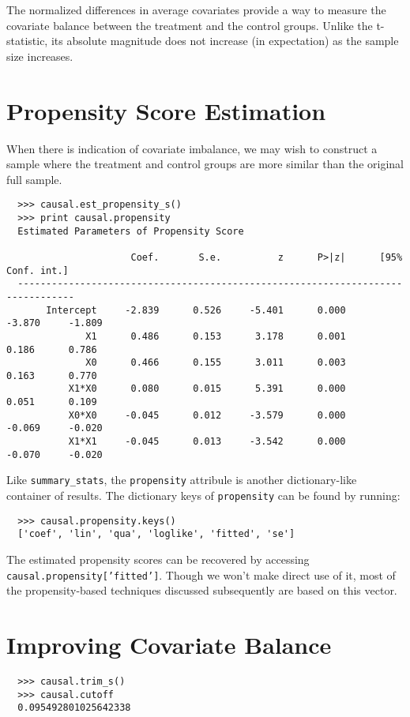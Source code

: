 \documentclass[12pt]{article}
\theoremstyle{definition}
\theoremstyle{definition}
\theoremstyle{definition}
\theoremstyle{remark}
\begin{document}
The normalized differences in average covariates provide a way to measure the covariate balance between the treatment and the control groups. Unlike the t-statistic, its absolute magnitude does not increase (in expectation) as the sample size increases.

\section*{Propensity Score Estimation}

When there is indication of covariate imbalance, we may wish to construct a sample where the treatment and control groups are more similar than the original full sample.

\begin{verbatim}
  >>> causal.est_propensity_s()
  >>> print causal.propensity
  Estimated Parameters of Propensity Score
  
                      Coef.       S.e.          z      P>|z|      [95% Conf. int.]
  --------------------------------------------------------------------------------
       Intercept     -2.839      0.526     -5.401      0.000     -3.870     -1.809
              X1      0.486      0.153      3.178      0.001      0.186      0.786
              X0      0.466      0.155      3.011      0.003      0.163      0.770
           X1*X0      0.080      0.015      5.391      0.000      0.051      0.109
           X0*X0     -0.045      0.012     -3.579      0.000     -0.069     -0.020
           X1*X1     -0.045      0.013     -3.542      0.000     -0.070     -0.020
\end{verbatim}

Like \texttt{summary\_stats}, the \texttt{propensity} attribule is another dictionary-like container of results. The dictionary keys of \texttt{propensity} can be found by running:
\begin{verbatim}
  >>> causal.propensity.keys()
  ['coef', 'lin', 'qua', 'loglike', 'fitted', 'se']
\end{verbatim}
The estimated propensity scores can be recovered by accessing \texttt{causal.propensity['fitted']}. Though we won't make direct use of it, most of the propensity-based techniques discussed subsequently are based on this vector.

\section*{Improving Covariate Balance}

\begin{verbatim}
  >>> causal.trim_s()
  >>> causal.cutoff
  0.095492801025642338
\end{verbatim}
\end{document}
